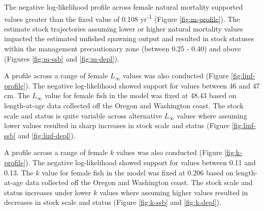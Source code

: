 \documentclass[11pt,
  english,
  a4paper,
]{article}
\begin{document}
\leavevmode\tagmcend\tagstructend\par


The negative log-likelihood profile across female natural mortality supported values greater than the fixed value of 0.108 yr\textsuperscript{-1} (Figure \ref{fig:m-profile}). The estimate stock trajectories assuming lower or higher natural mortality values impacted the estimated unfished spawning output and resulted in stock statuses within the management precautionary zone (between 0.25 - 0.40) and above (Figures \ref{fig:m-ssb} and \ref{fig:m-depl}).

\leavevmode\tagmcend\tagstructend\par


A profile across a range of female {\(L_{\infty}\)\leavevmode\tagmcend\tagstructend} values was also conducted (Figure \ref{fig:linf-profile}). The negative log-likelihood showed support for values between 46 and 47 cm. The {\(L_{\infty}\)\leavevmode\tagmcend\tagstructend} value for female fish in the model was fixed at 48.43 based on length-at-age data collected off the Oregon and Washington coast. The stock scale and status is quite variable across alternative {\(L_{\infty}\)\leavevmode\tagmcend\tagstructend} values where assuming lower values resulted in sharp increases in stock scale and status (Figure \ref{fig:linf-ssb} and \ref{fig:linf-depl}).

\leavevmode\tagmcend\tagstructend\par


A profile across a range of female {\(k\)\leavevmode\tagmcend\tagstructend} values was also conducted (Figure \ref{fig:k-profile}). The negative log-likelihood showed support for values between 0.11 and 0.13. The {\(k\)\leavevmode\tagmcend\tagstructend} value for female fish in the model was fixed at 0.206 based on length-at-age data collected off the Oregon and Washington coast. The stock scale and status increases under lower {\(k\)\leavevmode\tagmcend\tagstructend} values where assuming higher values resulted in decreases in stock scale and status (Figure \ref{fig:k-ssb} and \ref{fig:k-depl}).
\end{document}
